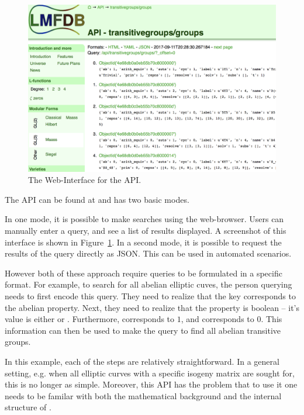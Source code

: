 \begin{figure}[h]
  \begin{center}
    \includegraphics[width=\textwidth]{APIScreenshot.png}
  \end{center}

  \caption[The Web-Interface for the \lmfdb API. ]{
    The Web-Interface for the \lmfdb API. 
  }
  \label{fig:apiscreenshot}
\end{figure}
The \lmfdb API can be found at  and has two basic modes. 

In one mode, it is possible to make searches using the web-browser. 
Users can manually enter a query, and see a list of results displayed. 
A screenshot of this interface is shown in Figure~\ref{fig:apiscreenshot}. 
In a second mode, it is possible to request the results of the query directly as JSON. 
This can be used in automated scenarios. 

However both of these approach require queries to be formulated in a specific format.
For example, to search for all abelian elliptic cuves, the person querying \lmfdb needs to first encode this query. 
They need to realize that the  key corresponds to the abelian property. 
Next, they need to realize that the property is boolean -- it's value is either  or . 
Furthermore,  corresponds to $1$, and  corresponds to $0$. 
This information can then be used to make the query  to find all abelian transitive groups. 

In this example, each of the steps are relatively straightforward. 
In a general setting, e.g. when all elliptic curves with a specific isogeny matrix are sought for, this is no longer as simple. 
Moreover, this API has the problem that to use it one needs to be familar with both the mathematical background and the internal structure of \lmfdb. 

